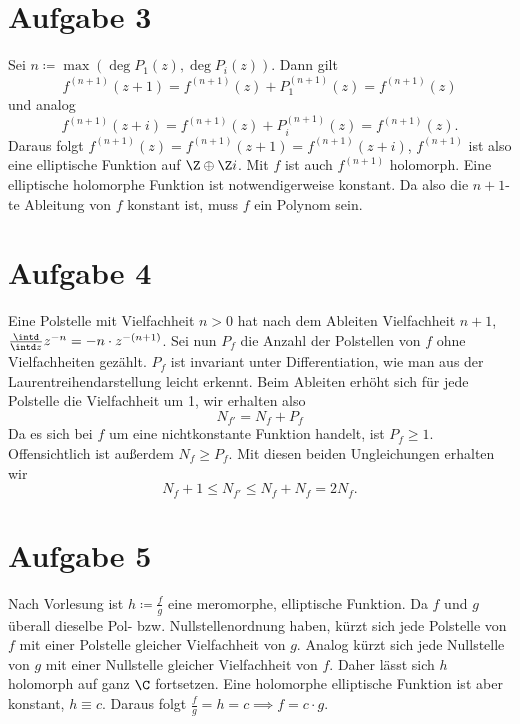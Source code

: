 \documentclass{article}
\begin{document}
    \section*{Aufgabe 3}
       Sei $n \coloneqq \max(\deg P_1(z), \deg P_i(z))$. Dann gilt $$f^{(n+1)}(z + 1) = f^{(n+1)}(z) + P_1^{(n+1)}(z) = f^{(n+1)}(z)$$ und analog $$f^{(n+1)}(z + i) = f^{(n+1)}(z) + P_i^{(n+1)}(z) = f^{(n+1)}(z).$$
       Daraus folgt $f^{(n+1)}(z) = f^{(n+1)}(z+1) = f^{(n+1)}(z+i)$, $f^{(n+1)}$ ist also eine elliptische Funktion auf $\Z \oplus \Z i $. Mit $f$ ist auch $f^{(n+1)}$ holomorph. Eine elliptische holomorphe Funktion ist notwendigerweise konstant. Da also die $n+1$-te Ableitung von $f$ konstant ist, muss $f$ ein Polynom sein.
    \section*{Aufgabe 4}
    Eine Polstelle mit Vielfachheit $n > 0$ hat nach dem Ableiten Vielfachheit $n+1$, $\frac{\intd}{\intd z} z^{-n} = -n \cdot z^{-(n+1)}$.
    Sei nun $P_f$ die Anzahl der Polstellen von $f$ ohne Vielfachheiten gezählt. $P_f$ ist invariant unter Differentiation, wie man aus der Laurentreihendarstellung leicht erkennt. Beim Ableiten erhöht sich für jede Polstelle die Vielfachheit um 1, wir erhalten also \[
      N_{f'} = N_f + P_f  
    \]
    Da es sich bei $f$ um eine nichtkonstante Funktion handelt, ist $P_f \geq 1$. Offensichtlich ist außerdem $N_f \geq P_f$. Mit diesen beiden Ungleichungen erhalten wir
    \[
        N_f + 1 \leq N_{f'} \leq N_f + N_f = 2 N_f.
    \]
    \section*{Aufgabe 5}
    Nach Vorlesung ist $h \coloneqq \frac{f}{g}$ eine meromorphe, elliptische Funktion. Da $f$ und $g$ überall dieselbe Pol- bzw. Nullstellenordnung haben, kürzt sich jede Polstelle von $f$ mit einer Polstelle gleicher Vielfachheit von $g$. Analog kürzt sich jede Nullstelle von $g$ mit einer Nullstelle gleicher Vielfachheit von $f$. Daher lässt sich $h$ holomorph auf ganz $\C$ fortsetzen. Eine holomorphe elliptische Funktion ist aber konstant, $h \equiv c$. Daraus folgt $\frac{f}{g} = h = c\implies f = c \cdot g$.
\end{document}
